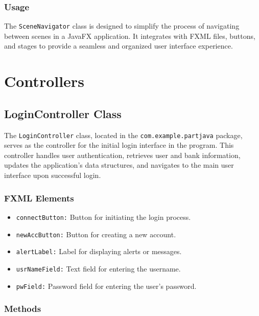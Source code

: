 \documentclass{article}
\begin{document}
\subsubsection{Usage}

The \texttt{SceneNavigator} class is designed to simplify the process of navigating between scenes in a JavaFX application. It integrates with FXML files, buttons, and stages to provide a seamless and organized user interface experience.



\newpage
\section{Controllers}\label{controllers}

\subsection{LoginController Class}

The \texttt{LoginController} class, located in the \texttt{com.example.partjava} package, serves as the controller for the initial login interface in the program. This controller handles user authentication, retrieves user and bank information, updates the application's data structures, and navigates to the main user interface upon successful login.

\subsubsection{FXML Elements}

\begin{itemize}
    \item \texttt{connectButton:} Button for initiating the login process.
    \item \texttt{newAccButton:} Button for creating a new account.
    \item \texttt{alertLabel:} Label for displaying alerts or messages.
    \item \texttt{usrNameField:} Text field for entering the username.
    \item \texttt{pwField:} Password field for entering the user's password.
\end{itemize}

\subsubsection{Methods}
\end{document}
